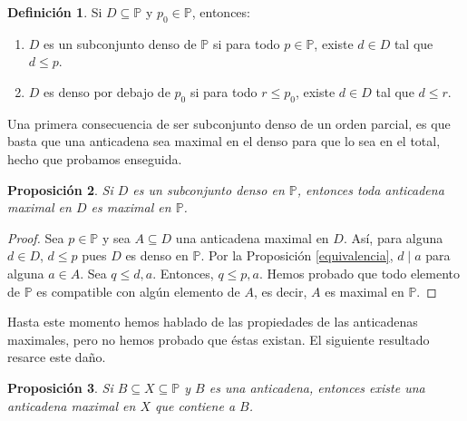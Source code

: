 \documentclass[11pt]{unam_tesis1}
\theoremstyle{MyThmStyle}
\theoremstyle{definition}
\newtheorem{definition}{Definici\'on}[chapter]
\theoremstyle{plain}
\newtheorem{proposition}[definition]{Proposici\'on}
\theoremstyle{remark}
\let\leq\leqslant
\begin{document}
\begin{definition} Si $D\subseteq \mathbb P$ y $p_0\in \mathbb P$, entonces:
\begin{enumerate}
\item $D$ es un subconjunto denso de $\mathbb P$ si para todo $p\in \mathbb P$, existe $d\in D$ tal que $d\leq p$.
\item $D$ es denso por debajo de $p_0$ si para todo $r\leq p_0$, existe $d\in D$ tal que $d\leq r$.
\end{enumerate}
\end{definition}

Una primera consecuencia de ser subconjunto denso de un orden parcial, es que basta que una anticadena sea maximal en el denso para que lo sea en el total, hecho que probamos enseguida.

\begin{proposition}\label{amaximalendenso}
Si $D$ es un subconjunto denso en $\mathbb P$, entonces toda anticadena maximal en $D$ es maximal en $\mathbb P$.
\end{proposition}

\begin{proof}
Sea $p\in \mathbb P$ y sea $A\subseteq D$ una anticadena maximal en $D$. As\'i, para alguna $d\in D$,  $d\leq p$ pues $D$ es denso en $\mathbb P$. Por la Proposici\'on \ref{equivalencia}, $d\mid a$ para alguna $a\in A$. Sea $q\leq d,a$. Entonces, $q\leq p,a$. Hemos probado que todo elemento de $\mathbb P$ es compatible con alg\'un elemento de $A$, es decir, $A$ es maximal en $\mathbb P$.
\end{proof}

Hasta este momento hemos hablado de las propiedades de las anticadenas maximales, pero no hemos probado que \'estas existan. El siguiente resultado resarce este da\~no.

\begin{proposition}\label{extenderanticadenamaximal}
Si $B\subseteq X \subseteq \mathbb P$ y $B$ es una anticadena, entonces existe una anticadena maximal en $X$ que contiene a $B$.
\end{proposition}
\end{document}
